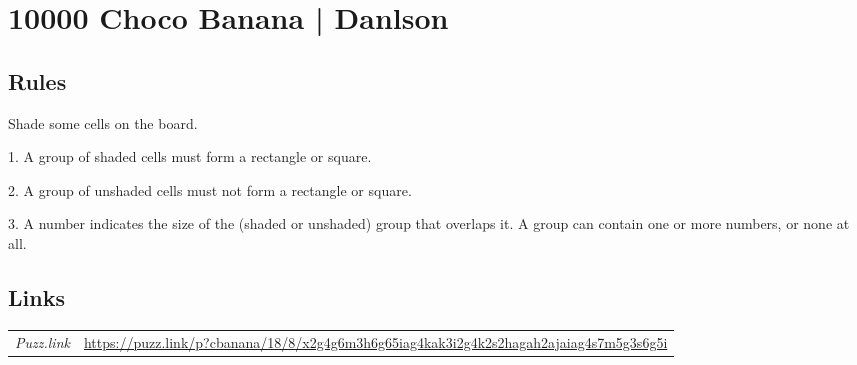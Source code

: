 \section[10000 Choco Banana | Danlson {[\emph{Choco Banana}]}]{10000 Choco Banana | {\normalfont Danlson}}
\label{sec:53-10000-choco-banana-danlson}

\subsection*{Rules}
\begin{markdown}
Shade some cells on the board.

1. A group of shaded cells must form a rectangle or square.

2. A group of unshaded cells must not form a rectangle or square.

3. A number indicates the size of the (shaded or unshaded) group that overlaps it. A group can contain one or more numbers, or none at all.
\end{markdown}
\subsection*{Links}
\begin{tabularx}{\textwidth}{l X}
\emph{Puzz.link} & \url{https://puzz.link/p?cbanana/18/8/x2g4g6m3h6g65iag4kak3i2g4k2s2hagah2ajaiag4s7m5g3s6g5i} \\
\end{tabularx}
\pagebreak
